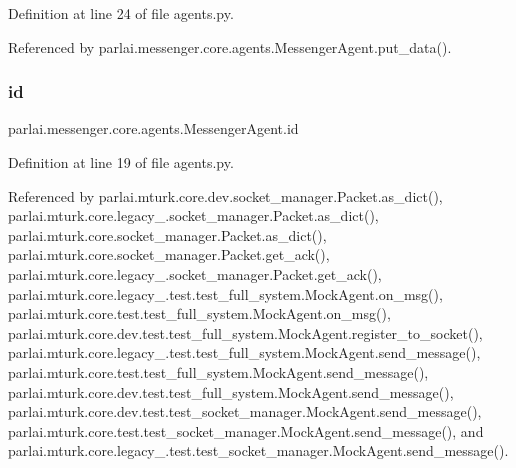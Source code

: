 Definition at line 24 of file agents.\+py.



Referenced by parlai.\+messenger.\+core.\+agents.\+Messenger\+Agent.\+put\+\_\+data().

\mbox{\label{classparlai_1_1messenger_1_1core_1_1agents_1_1MessengerAgent_a72910180b745a5021b8d0a9e0957adcd}} 
\subsubsection{\texorpdfstring{id}{id}}
{\footnotesize\ttfamily parlai.\+messenger.\+core.\+agents.\+Messenger\+Agent.\+id}



Definition at line 19 of file agents.\+py.



Referenced by parlai.\+mturk.\+core.\+dev.\+socket\+\_\+manager.\+Packet.\+as\+\_\+dict(), parlai.\+mturk.\+core.\+legacy\+\_.\+socket\+\_\+manager.\+Packet.\+as\+\_\+dict(), parlai.\+mturk.\+core.\+socket\+\_\+manager.\+Packet.\+as\+\_\+dict(), parlai.\+mturk.\+core.\+socket\+\_\+manager.\+Packet.\+get\+\_\+ack(), parlai.\+mturk.\+core.\+legacy\+\_.\+socket\+\_\+manager.\+Packet.\+get\+\_\+ack(), parlai.\+mturk.\+core.\+legacy\+\_.\+test.\+test\+\_\+full\+\_\+system.\+Mock\+Agent.\+on\+\_\+msg(), parlai.\+mturk.\+core.\+test.\+test\+\_\+full\+\_\+system.\+Mock\+Agent.\+on\+\_\+msg(), parlai.\+mturk.\+core.\+dev.\+test.\+test\+\_\+full\+\_\+system.\+Mock\+Agent.\+register\+\_\+to\+\_\+socket(), parlai.\+mturk.\+core.\+legacy\+\_.\+test.\+test\+\_\+full\+\_\+system.\+Mock\+Agent.\+send\+\_\+message(), parlai.\+mturk.\+core.\+test.\+test\+\_\+full\+\_\+system.\+Mock\+Agent.\+send\+\_\+message(), parlai.\+mturk.\+core.\+dev.\+test.\+test\+\_\+full\+\_\+system.\+Mock\+Agent.\+send\+\_\+message(), parlai.\+mturk.\+core.\+dev.\+test.\+test\+\_\+socket\+\_\+manager.\+Mock\+Agent.\+send\+\_\+message(), parlai.\+mturk.\+core.\+test.\+test\+\_\+socket\+\_\+manager.\+Mock\+Agent.\+send\+\_\+message(), and parlai.\+mturk.\+core.\+legacy\+\_.\+test.\+test\+\_\+socket\+\_\+manager.\+Mock\+Agent.\+send\+\_\+message().

